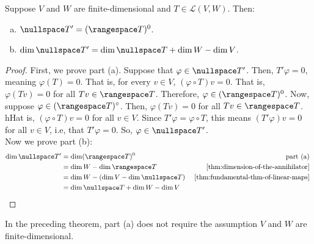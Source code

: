 \documentclass{article}
\begin{document}
\begin{theorem}
  \label{thm:nullspace-T'}
  Suppose $V$ and $W$ are finite-dimensional and $T \in \mathcal{L}(V,
  W)$. Then:
  \begin{enumerate}[(a)]
  \item $\nullspace T' = (\rangespace T)^0$.
  \item $\dim \nullspace T' = \dim \nullspace T + \dim W - \dim V$.
  \end{enumerate}
\end{theorem}
\begin{proof}
  First, we prove part (a). Suppose that $\varphi \in \nullspace
  T'$. Then, $T'\varphi = 0$, meaning $\varphi (T) = 0$. That is, for
  every $v \in V$, $(\varphi \circ T)v = 0$. That is, $\varphi(Tv) =
  0$ for all $Tv \in \rangespace T$. Therefore, $\varphi \in
  (\rangespace T)^0$. Now, suppose $\varphi \in (\rangespace
  T)^{\circ}$. Then, $\varphi(Tv) = 0$ for all $Tv \in \rangespace
  T$. hHat is, $(\varphi \circ T)v = 0$ for all $v \in V$. Since
  $T'\varphi = \varphi \circ T$, this means $(T'\varphi)v = 0$ for all
  $v \in V$, i.e, that $T'\varphi = 0$. So, $\varphi \in \nullspace
  T'$. \\
  Now we prove part (b):
  \begin{align*}
    \dim \nullspace T' &= \dim (\rangespace T)^0 & \text{ part (a) }
    \\
    &= \dim W - \dim \rangespace T & \text{
                                     \cref{thm:dimension-of-the-annihilator}
                                     } \\
    &= \dim W - (\dim V - \dim \nullspace T) & \text{
                                               \cref{thm:fundamental-thm-of-linear-maps}
                                               } \\
    &= \dim \nullspace T + \dim W - \dim V
  \end{align*}
\end{proof}

\begin{remark}
  In the preceding theorem, part (a) does not require the assumption
  $V$ and $W$ are finite-dimensional.
\end{remark}
\end{document}
